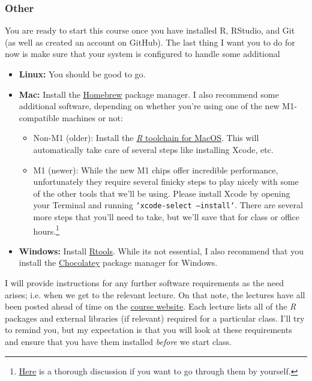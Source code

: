 \documentclass[12]{article}
\begin{document}
\vspace{-0.25cm}
\subsubsection*{Other}

You are ready to start this course once you have installed R, RStudio, and Git
(as well as created an account on GitHub). The last thing I want you to do for
now is make sure that your system is configured to handle some additional


\begin{itemize}
	\item \textbf{Linux:} You should be good to go.  
	\item \textbf{Mac:} Install	the \href{https://brew.sh/}{Homebrew} package
	manager. I also recommend some additional software, depending on whether
	you're using one of the new M1-compatible machines or not:
	\begin{itemize}
		\item Non-M1 (older): Install the
		\href{https://github.com/rmacoslib/r-macos-rtools#installer-package-for-macos-r-toolchain-}{\emph{R}
		toolchain for MacOS}. This will automatically take care of several steps
		like installing Xcode, etc.
		\item M1 (newer): While the new M1 chips offer incredible performance,
		unfortunately they require several finicky steps to play nicely with
		some of the other tools that we'll be using. Please install Xcode by
		opening your Terminal and running \texttt{`xcode-select --install`}.
		There are several more steps that you'll need to take, but we'll save
		that for
		class or office hours.\footnote{\href{https://pat-s.me/transitioning-from-x86-to-arm64-on-macos-experiences-of-an-r-user/}{Here}
		is a thorough discussion if you want to go through them by yourself.}
	\end{itemize}
	\item \textbf{Windows:} Install \href{https://cran.r-project.org/bin/windows/Rtools/}{Rtools}. While its not essential, I also recommend that you install the \href{https://chocolatey.org/}{Chocolatey} package manager for Windows.
\end{itemize}

I will provide instructions for any further software requirements as the need
arises; i.e. when we get to the relevant lecture. On that note, the lectures
have all been posted ahead of time on the
\href{https://github.com/uo-ec607}{course website}. Each lecture lists all of
the \textit{R} packages and external libraries (if relevant) required for a
particular class. I'll try to remind you, but my expectation is that you will
look at these requirements and ensure that you have them installed
\textit{before} we start class. 
\end{document}

